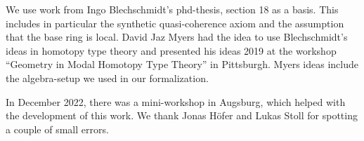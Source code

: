 We use work from Ingo Blechschmidt's phd-thesis, section 18 as a basis.
This includes in particular the synthetic quasi-coherence axiom and the assumption that the base ring is local.
David Jaz Myers had the idea to use Blechschmidt's ideas in homotopy type theory
and presented his ideas 2019 at the workshop ``Geometry in Modal Homotopy Type Theory'' in Pittsburgh.
Myers ideas include the algebra-setup we used in our formalization.

In December 2022, there was a mini-workshop in Augsburg, which helped with the development of this work.
We thank Jonas Höfer and Lukas Stoll for spotting a couple of small errors.